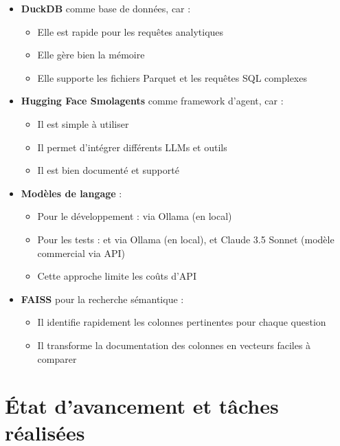 \documentclass[a4paper,11pt]{article}
\begin{document}
\begin{itemize}
    \item \textbf{DuckDB} comme base de données, car :
    \begin{itemize}
        \item Elle est rapide pour les requêtes analytiques
        \item Elle gère bien la mémoire
        \item Elle supporte les fichiers Parquet et les requêtes SQL complexes
    \end{itemize}
    \item \textbf{Hugging Face Smolagents} comme framework d'agent, car :
    \begin{itemize}
        \item Il est simple à utiliser
        \item Il permet d'intégrer différents LLMs et outils
        \item Il est bien documenté et supporté
    \end{itemize}
    \item \textbf{Modèles de langage} :
    \begin{itemize}
        \item Pour le développement :  via Ollama (en local)
        \item Pour les tests :  et  via Ollama (en local), et Claude 3.5 Sonnet (modèle commercial via API)
        \item Cette approche limite les coûts d'API
    \end{itemize}
    \item \textbf{FAISS} pour la recherche sémantique :
    \begin{itemize}
        \item Il identifie rapidement les colonnes pertinentes pour chaque question
        \item Il transforme la documentation des colonnes en vecteurs faciles à comparer
    \end{itemize}
\end{itemize}


\section{État d'avancement et tâches réalisées}
\label{sec:progress}
\end{document}
